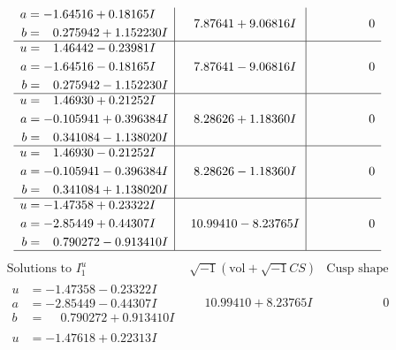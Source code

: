 \documentclass[1p]{elsarticle_modified}
\theoremstyle{definition}
\newcommand{\I}{\sqrt{-1}}
\begin{document}
$$\begin{array}{c|c|c}
\begin{aligned}
a &= -1.64516 + 0.18165 I \\
b &= \phantom{-}0.275942 + 1.152230 I\end{aligned}
 & \phantom{-}7.87641 + 9.06816 I & \phantom{-0.000000 } 0 \\ \hline\begin{aligned}
u &= \phantom{-}1.46442 - 0.23981 I \\
a &= -1.64516 - 0.18165 I \\
b &= \phantom{-}0.275942 - 1.152230 I\end{aligned}
 & \phantom{-}7.87641 - 9.06816 I & \phantom{-0.000000 } 0 \\ \hline\begin{aligned}
u &= \phantom{-}1.46930 + 0.21252 I \\
a &= -0.105941 + 0.396384 I \\
b &= \phantom{-}0.341084 - 1.138020 I\end{aligned}
 & \phantom{-}8.28626 + 1.18360 I & \phantom{-0.000000 } 0 \\ \hline\begin{aligned}
u &= \phantom{-}1.46930 - 0.21252 I \\
a &= -0.105941 - 0.396384 I \\
b &= \phantom{-}0.341084 + 1.138020 I\end{aligned}
 & \phantom{-}8.28626 - 1.18360 I & \phantom{-0.000000 } 0 \\ \hline\begin{aligned}
u &= -1.47358 + 0.23322 I \\
a &= -2.85449 + 0.44307 I \\
b &= \phantom{-}0.790272 - 0.913410 I\end{aligned}
 & \phantom{-}10.99410 - 8.23765 I & \phantom{-0.000000 } 0\\
 \hline 
 \end{array}$$\newpage$$\begin{array}{c|c|c}  
\text{Solutions to }I^u_{1}& \I (\text{vol} + \sqrt{-1}CS) & \text{Cusp shape}\\
 \hline 
\begin{aligned}
u &= -1.47358 - 0.23322 I \\
a &= -2.85449 - 0.44307 I \\
b &= \phantom{-}0.790272 + 0.913410 I\end{aligned}
 & \phantom{-}10.99410 + 8.23765 I & \phantom{-0.000000 } 0 \\ \hline\begin{aligned}
u &= -1.47618 + 0.22313 I \\

\end{aligned}
\end{array}$$
\end{document}
